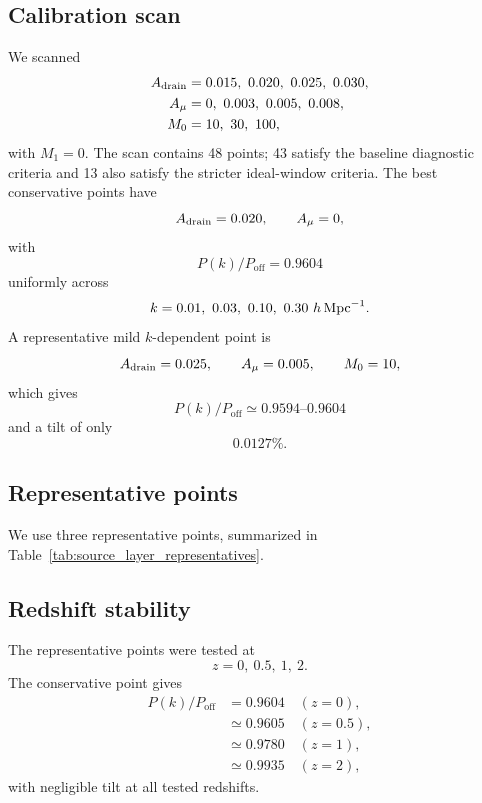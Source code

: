 ﻿\documentclass[11pt,prd,preprint,nofootinbib,amsmath,amssymb]{revtex4-2}
\begin{document}
\subsection{Calibration scan}

We scanned
\begin{align}
A_{\rm drain}&=0.015,\ 0.020,\ 0.025,\ 0.030,
\\
A_\mu&=0,\ 0.003,\ 0.005,\ 0.008,
\\
M_0&=10,\ 30,\ 100,
\end{align}
with $M_1=0$. The scan contains 48 points; 43 satisfy the baseline diagnostic
criteria and 13 also satisfy the stricter ideal-window criteria.
The best conservative points have
\begin{equation}
A_{\rm drain}=0.020,
\qquad
A_\mu=0,
\end{equation}
with
\begin{equation}
P(k)/P_{\mathrm{off}}=0.9604
\end{equation}
uniformly across
\begin{equation}
k=0.01,\ 0.03,\ 0.10,\ 0.30\ h\,{\rm Mpc}^{-1}.
\end{equation}
A representative mild $k$-dependent point is
\begin{equation}
A_{\rm drain}=0.025,
\qquad
A_\mu=0.005,
\qquad
M_0=10,
\end{equation}
which gives
\begin{equation}
P(k)/P_{\mathrm{off}}\simeq0.9594\text{--}0.9604
\end{equation}
and a tilt of only
\begin{equation}
0.0127\%.
\end{equation}

\subsection{Representative points}

We use three representative points, summarized in
Table~\ref{tab:source_layer_representatives}.


\subsection{Redshift stability}

The representative points were tested at
\begin{equation}
z=0,\ 0.5,\ 1,\ 2.
\end{equation}
The conservative point gives
\begin{align}
P(k)/P_{\mathrm{off}}
&=
0.9604
\quad (z=0),
\\
&\simeq0.9605
\quad (z=0.5),
\\
&\simeq0.9780
\quad (z=1),
\\
&\simeq0.9935
\quad (z=2),
\end{align}
with negligible tilt at all tested redshifts.
\end{document}
